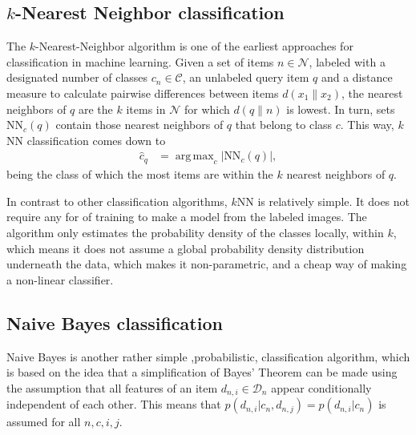 \documentclass[a4paper,10pt]{article}
\DeclareMathOperator*{\argmax}{arg\,max}
\begin{document}
\subsection{$k$-Nearest Neighbor classification} %
\label{sub:_k_nearest_neighbor}

The $k$-Nearest-Neighbor algorithm is one of the earliest approaches for classification in machine learning. Given a set of items $n \in \mathcal{N}$, labeled with a designated number of classes $c_n \in \mathcal{C}$, an unlabeled query item $q$ and a distance measure to calculate pairwise differences between items $d(x_1\|x_2)$, the nearest neighbors of $q$ are the $k$ items in $\mathcal{N}$ for which $d(q\|n)$ is lowest. In turn, sets $\text{NN}_c(q)$ contain those nearest neighbors of $q$ that belong to class $c$. This way, $k$NN classification comes down to
\begin{align}
    \hat c_q &= \argmax_c |\text{NN}_c(q)|,
\end{align}
being the class of which the most items are within the $k$ nearest neighbors of $q$.

In contrast to other classification algorithms, $k$NN is relatively simple. It does not require any for of training to make a model from the labeled images. The algorithm only estimates the probability density of the classes locally, within $k$, which means it does not assume a global probability density distribution underneath the data, which makes it non-parametric, and a cheap way of making a non-linear classifier.

\subsection{Naive Bayes classification} %
\label{sub:NB}

Naive Bayes is another rather simple ,probabilistic, classification algorithm, which is based on the idea that a simplification of Bayes' Theorem can be made using the assumption that all features of an item $d_{n,i} \in \mathcal{D}_n$ appear conditionally independent of each other. This means that $p(d_{n,i} | c_n, d_{n,j}) = p(d_{n,i}|c_n)$ is assumed for all $n,c,i,j$. 
\end{document}
